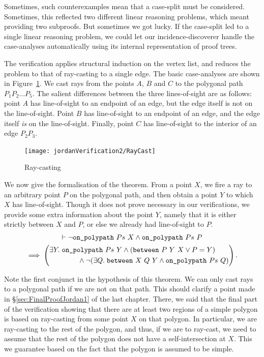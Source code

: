 Sometimes, such counterexamples mean that a case-split must be considered. Sometimes, this reflected two different linear reasoning problems, which meant providing two subproofs. But sometimes we got lucky. If the case-split led to a single linear reasoning problem, we could let our incidence-discoverer handle the case-analyses automatically using its internal representation of proof trees.

The verification applies structural induction on the vertex list, and reduces the problem to that of ray-casting to a single edge. The basic case-analyses are shown in Figure~\ref{fig:RayCast}. We cast rays from the points $A$, $B$ and $C$ to the polygonal path $P_1P_2\ldots P_5$. The salient differences between the three lines-of-sight are as follows: point $A$ has line-of-sight to an endpoint of an edge, but the edge itself is not on the line-of-sight. Point $B$ has line-of-sight to an endpoint of an edge, and the edge itself \emph{is} on the line-of-sight. Finally, point $C$ has line-of-sight to the interior of an edge $P_2P_3$. 

\begin{figure}
\centering\texttt{[image: jordanVerification2/RayCast]}
\caption{Ray-casting}
\label{fig:RayCast}
\end{figure}

We now give the formalisation of the theorem. From a point $X$, we fire a ray to an arbitrary point $P$ on the polygonal path, and then obtain a point $Y$ to which $X$ has line-of-sight. Though it does not prove necessary in our verifications, we provide some extra information about the point $Y$, namely that it is either strictly between $X$ and $P$, or else we already had line-of-sight to $P$. 
\begin{multline}\label{eq:RayCast}
  \vdash\neg\texttt{on\_polypath}\ Ps\ X \wedge \texttt{on\_polypath}\ Ps\ P\\
  \implies \left(
    \begin{aligned}&\exists Y.\; \texttt{on\_polypath}\ Ps\ Y \wedge (\texttt{between}\ P\ Y\ X \vee P = Y)\\
      &\qquad\qquad\wedge \neg(\exists Q.\; \texttt{between}\ X\ Q\ Y \wedge \texttt{on\_polypath}\ Ps\ Q)
    \end{aligned}\right).
\end{multline}

Note the first conjunct in the hypothesis of this theorem. We can only cast rays to a polygonal path if we are not on that path. This should clarify a point made in \S\ref{sec:FinalProofJordan1} of the last chapter. There, we said that the final part of the verification showing that there are at least two regions of a simple polygon is based on ray-casting from some point $X$ on that polygon. In particular, we are ray-casting to the rest of the polygon, and thus, if we are to ray-cast, we need to assume that the rest of the polygon does not have a self-intersection at $X$. This we guarantee based on the fact that the polygon is assumed to be simple.

